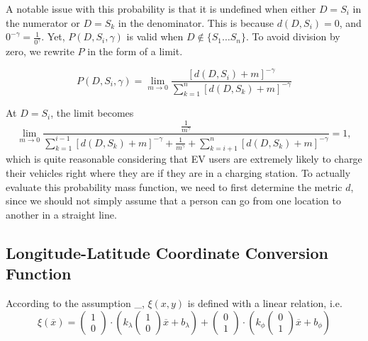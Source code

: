 \documentclass[10pt]{article}
\begin{document}
A notable issue with this probability is that it is undefined when either $D = S_i$ in the numerator or $D = S_k$ in the denominator. This is because $d\left(D, S_i\right) = 0$, and $0^{-\gamma} = \frac{1}{0^\gamma}$. Yet, $P(D,S_i,\gamma)$ is valid when $D \notin \{S_1 \dots S_n\}$. To avoid division by zero, we rewrite $P$ in the form of a limit.

\begin{equation}\label{eq:3}
P\left(D, S_i, \gamma\right) = \lim_{m \to 0} \frac{\left[ d\left(D, S_i\right) + m \right]^{-\gamma}} {\displaystyle\sum_{k=1}^n \left[d\left(D, S_k\right) + m \right]^{-\gamma}}
\end{equation}

At $D = S_i$, the limit becomes
\begin{equation} \lim_{m \to 0} \frac{\displaystyle\frac{1}{m^\gamma}}{\displaystyle \sum_{k=1}^{i-1} \left[d\left(D, S_k\right) + m \right]^{-\gamma} + \frac{1}{m^\gamma} + \sum_{k=i+1}^{n} \left[d\left(D, S_k\right) + m \right]^{-\gamma}} = 1,
\end{equation}
which is quite reasonable considering that EV users are extremely likely to charge their vehicles right where they are if they are in a charging station. To actually evaluate this probability mass function, we need to first determine the metric $d$, since we should not simply assume that a person can go from one location to another in a straight line.

\subsection{Longitude-Latitude Coordinate Conversion Function}
According to the assumption \_, $\xi(x,y)$ is defined with a linear relation, i.e.
\[
\xi(\overline{x})=\begin{pmatrix}1\\0\end{pmatrix}\cdot\left(k_\lambda\begin{pmatrix}1\\0\end{pmatrix}\overline{x}+b_\lambda\right)+\begin{pmatrix}0\\1\end{pmatrix}\cdot\left(k_\phi\begin{pmatrix}0\\1\end{pmatrix}\overline{x}+b_\phi\right)
\]
\end{document}
